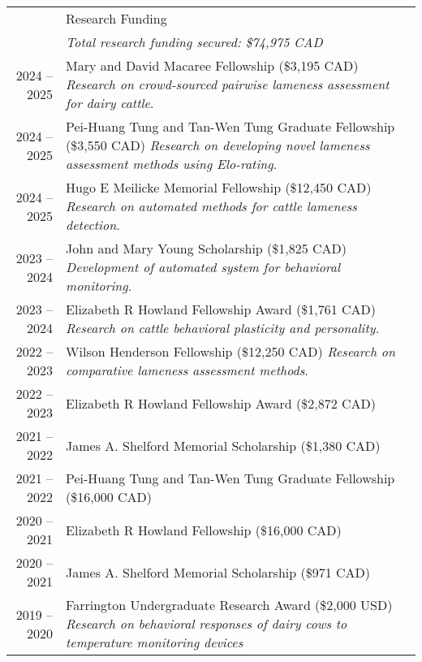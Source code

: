 \documentclass[letterpaper, 11pt]{article}
\newcommand{\headingfont}{\Large\color{OliveGreen}}
\newenvironment{SectionTableSingleSpace}[1]{
	\renewcommand*{\arraystretch}{1.2}
	\setlength{\tabcolsep}{10pt}
	\begin{longtable}{Rp{5.2in}} & #1 \\[0.6em]}
{\end{longtable}\vspace{-.3cm}}
\begin{document}
\begin{SectionTableSingleSpace}{\headingfont Research Funding}
& \textit{Total research funding secured: \$74,975 CAD} \\[6pt]
2024 -- 2025 &
Mary and David Macaree Fellowship (\$3,195 CAD) \newline
\textit{Research on crowd-sourced pairwise lameness assessment for dairy cattle}. \\
2024 -- 2025 &
Pei-Huang Tung and Tan-Wen Tung Graduate Fellowship (\$3,550 CAD) \newline 
\textit{Research on developing novel lameness assessment methods using Elo-rating}. \\
2024 -- 2025 &
Hugo E Meilicke Memorial Fellowship (\$12,450 CAD) \newline
\textit{Research on automated methods for cattle lameness detection}. \\
2023 -- 2024 &
John and Mary Young Scholarship (\$1,825 CAD) \newline
\textit{Development of automated system for behavioral monitoring}. \\
2023 -- 2024 &
Elizabeth R Howland Fellowship Award (\$1,761 CAD) \newline
\textit{Research on cattle behavioral plasticity and personality}. \\
2022 -- 2023 &
Wilson Henderson Fellowship (\$12,250 CAD) \newline
\textit{Research on comparative lameness assessment methods}. \\
2022 -- 2023 &
Elizabeth R Howland Fellowship Award (\$2,872 CAD) \\
2021 -- 2022 &
James A. Shelford Memorial Scholarship (\$1,380 CAD) \\
2021 -- 2022 &
Pei-Huang Tung and Tan-Wen Tung Graduate Fellowship (\$16,000 CAD) \\
2020 -- 2021 &
Elizabeth R Howland Fellowship (\$16,000 CAD) \\
2020 -- 2021 &
James A. Shelford Memorial Scholarship (\$971 CAD) \\
2019 -- 2020 &
Farrington Undergraduate Research Award (\$2,000 USD) \newline
\textit{Research on behavioral responses of dairy cows to temperature monitoring devices}
\end{SectionTableSingleSpace}
\end{document}
